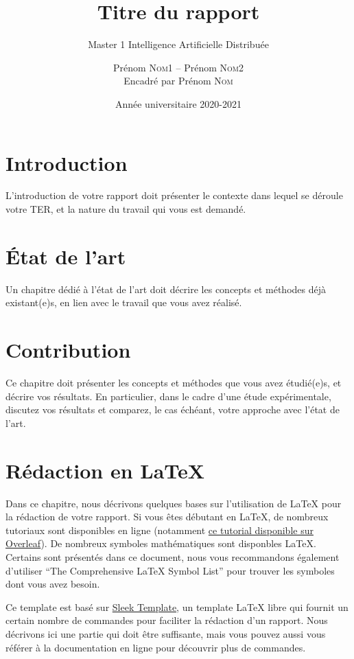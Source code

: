 \documentclass[a4paper, 12pt]{report}
\institute{Université de Paris}
\title{Titre du rapport}
\subtitle{Master 1 Intelligence Artificielle Distribuée}
\author{Prénom \textsc{Nom1} -- Prénom \textsc{Nom2}\\
{\small Encadré par Prénom \textsc{Nom}}}
\date{Année universitaire 2020-2021}
\begin{document}
    \maketitle

    \romantableofcontents

    \chapter{Introduction}

    L'introduction de votre rapport doit présenter le contexte dans lequel se déroule votre TER, et la nature du travail qui vous est demandé.

    \chapter{État de l'art}
    Un chapitre dédié à l'état de l'art doit décrire les concepts et méthodes déjà existant(e)s, en lien avec le travail que vous avez réalisé.
    
    \chapter{Contribution}
    Ce chapitre doit présenter les concepts et méthodes que vous avez étudié(e)s, et décrire vos résultats. En particulier, dans le cadre d'une étude expérimentale, discutez vos résultats et comparez, le cas échéant, votre approche avec l'état de l'art.

    \chapter{Rédaction en \LaTeX}
    Dans ce chapitre, nous décrivons quelques bases sur l'utilisation de \LaTeX{} pour la rédaction de votre rapport.
    Si vous êtes débutant en \LaTeX{}, de nombreux tutoriaux sont disponibles en ligne (notamment \href{https://www.overleaf.com/learn}{ce tutorial disponible sur Overleaf}). De nombreux symboles mathématiques sont disponbles \LaTeX{}. Certains sont présentés dans ce document, nous vous recommandons également d'utiliser \enquote{The Comprehensive \LaTeX{} Symbol List} \cite{pakin2020comprehensive} pour trouver les symboles dont vous avez besoin.
    
    Ce template est basé sur \href{https://fr.overleaf.com/latex/templates/sleek-template/hrksrrdywhfk}{Sleek Template}, un template \LaTeX{} libre qui fournit un certain nombre de commandes pour faciliter la rédaction d'un rapport. Nous décrivons ici une partie qui doit être suffisante, mais vous pouvez aussi vous référer à la documentation en ligne pour découvrir plus de commandes.
    
\end{document}
